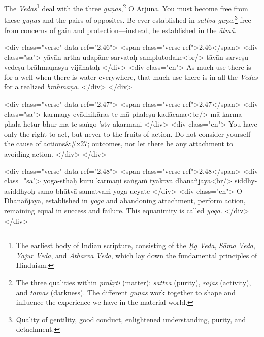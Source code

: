 {The \textit{Vedas}\footnote{The earliest body of Indian scripture, consisting of the \textit{Ṛg Veda}, \textit{Sāma Veda}, \textit{Yajur Veda}, and \textit{Atharva Veda}, which lay down the fundamental principles of Hinduism.} deal with the three \textit{guṇas},\footnote{The three qualities within \textit{prakṛti} (matter): \textit{sattva} (purity), \textit{rajas} (activity), and \textit{tamas} (darkness). The different \textit{guṇas} work together to shape and influence the experience we have in the material world.} O Arjuna. You must become free from these \textit{guṇas} and the pairs of opposites. Be ever established in \textit{sattva-guṇa},\footnote{Quality of gentility, good conduct, enlightened understanding, purity, and detachment.} free from concerns of gain and protection---instead, be established in the \textit{ātmā}.}


\begin{html}
<div class="verse" data-ref="2.46">
  <span class="verse-ref">2.46</span>
  <div class="sa">
    yāvān artha udapāne sarvataḥ samplutodake<br/>
    tāvān sarveṣu vedeṣu brāhmaṇasya vijānataḥ
  </div>
  <div class="en">
    As much use there is for a well when there is water everywhere, that much use there is in all the \textit{Vedas} for a realized \textit{brāhmaṇa}.
  </div>
</div>
\end{html}



\begin{html}
<div class="verse" data-ref="2.47">
  <span class="verse-ref">2.47</span>
  <div class="sa">
    karmaṇy evādhikāras te mā phaleṣu kadācana<br/>
    mā karma-phala-hetur bhūr mā te saṅgo ’stv akarmaṇi
  </div>
  <div class="en">
    You have only the right to act, but never to the fruits of action. Do not consider yourself the cause of actions&#x27; outcomes, nor let there be any attachment to avoiding action.
  </div>
</div>
\end{html}



\begin{html}
<div class="verse" data-ref="2.48">
  <span class="verse-ref">2.48</span>
  <div class="sa">
    yoga-sthaḥ kuru karmāṇi saṅgaṁ tyaktvā dhanañjaya<br/>
    siddhy-asiddhyoḥ samo bhūtvā samatvaṁ yoga ucyate
  </div>
  <div class="en">
    O Dhanañjaya, established in \textit{yoga} and abandoning attachment, perform action, remaining equal in success and failure. This equanimity is called \textit{yoga}.
  </div>
</div>
\end{html}




